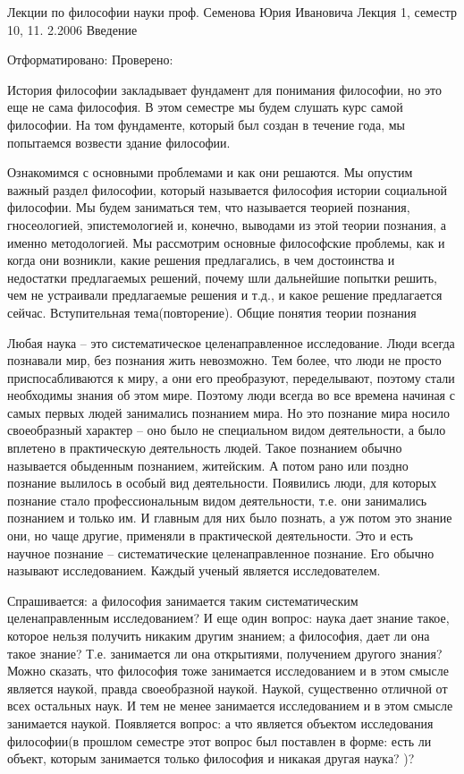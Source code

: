 
Лекции по философии науки проф. Семенова Юрия Ивановича
Лекция 1, семестр 10, 11. 2.2006
Введение

Отформатировано: Проверено:

История философии закладывает фундамент для понимания философии, но это еще не сама философия. В этом семестре мы будем слушать курс самой философии. На том фундаменте, который был создан в течение года, мы попытаемся возвести здание философии.

Ознакомимся с основными проблемами и как они решаются. Мы опустим важный раздел философии, который называется философия истории социальной философии. Мы будем заниматься тем, что называется теорией познания, гносеологией, эпистемологией и, конечно, выводами из этой теории познания, а именно методологией. Мы рассмотрим основные философские проблемы, как и когда они возникли, какие решения предлагались, в чем достоинства и недостатки предлагаемых решений, почему шли дальнейшие попытки решить, чем не устраивали предлагаемые решения и т.д., и какое решение предлагается сейчас.
Вступительная тема(повторение). Общие понятия теории познания

Любая наука – это систематическое целенаправленное исследование. Люди всегда познавали мир, без познания жить невозможно. Тем более, что люди не просто приспосабливаются к миру, а они его преобразуют, переделывают, поэтому стали необходимы знания об этом мире. Поэтому люди всегда во все времена начиная с самых первых людей занимались познанием мира. Но это познание мира носило своеобразный характер – оно было не специальном видом деятельности, а было вплетено в практическую деятельность людей. Такое познанием обычно называется обыденным познанием, житейским. А потом рано или поздно познание вылилось в особый вид деятельности. Появились люди, для которых познание стало профессиональным видом деятельности, т.е. они занимались познанием и только им. И главным для них было познать, а уж потом это знание они, но чаще другие, применяли в практической деятельности. Это и есть научное познание – систематические целенаправленное познание. Его обычно называют исследованием. Каждый ученый является исследователем.

Спрашивается: а философия занимается таким систематическим целенаправленным исследованием? И еще один вопрос: наука дает знание такое, которое нельзя получить никаким другим знанием; а философия, дает ли она такое знание? Т.е. занимается ли она открытиями, получением другого знания? Можно сказать, что философия тоже занимается исследованием и в этом смысле является наукой, правда своеобразной наукой. Наукой, существенно отличной от всех остальных наук. И тем не менее занимается исследованием и в этом смысле занимается наукой. Появляется вопрос: а что является объектом исследования философии(в прошлом семестре этот вопрос был поставлен в форме: есть ли объект, которым занимается только философия и никакая другая наука? )?

